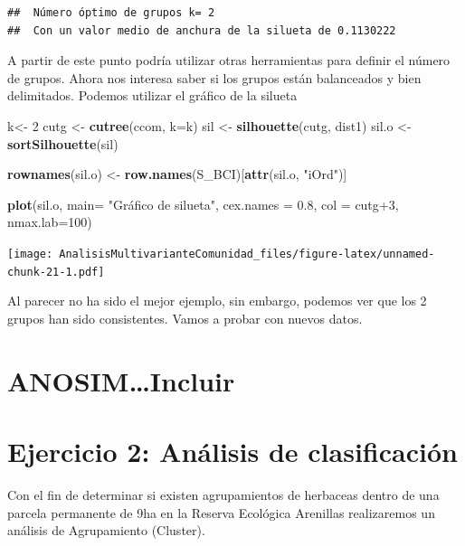 \documentclass[]{book}
\newenvironment{Shaded}{\begin{snugshade}}{\end{snugshade}}
\newcommand{\KeywordTok}[1]{\textcolor[rgb]{0.13,0.29,0.53}{\textbf{{#1}}}}
\newcommand{\DataTypeTok}[1]{\textcolor[rgb]{0.13,0.29,0.53}{{#1}}}
\newcommand{\DecValTok}[1]{\textcolor[rgb]{0.00,0.00,0.81}{{#1}}}
\newcommand{\FloatTok}[1]{\textcolor[rgb]{0.00,0.00,0.81}{{#1}}}
\newcommand{\StringTok}[1]{\textcolor[rgb]{0.31,0.60,0.02}{{#1}}}
\newcommand{\NormalTok}[1]{{#1}}
\begin{document}
\begin{verbatim}
##  Número óptimo de grupos k= 2 
##  Con un valor medio de anchura de la silueta de 0.1130222
\end{verbatim}

A partir de este punto podría utilizar otras herramientas para definir
el número de grupos. Ahora nos interesa saber si los grupos están
balanceados y bien delimitados. Podemos utilizar el gráfico de la
silueta

\begin{Shaded}
\begin{Highlighting}[]
\NormalTok{k<-}\StringTok{ }\DecValTok{2}
\NormalTok{cutg <-}\StringTok{ }\KeywordTok{cutree}\NormalTok{(ccom, }\DataTypeTok{k=}\NormalTok{k)}
\NormalTok{sil <-}\StringTok{ }\KeywordTok{silhouette}\NormalTok{(cutg, dist1)}
\NormalTok{sil.o <-}\StringTok{ }\KeywordTok{sortSilhouette}\NormalTok{(sil)}

\KeywordTok{rownames}\NormalTok{(sil.o) <-}\StringTok{ }\KeywordTok{row.names}\NormalTok{(S_BCI)[}\KeywordTok{attr}\NormalTok{(sil.o, }\StringTok{"iOrd"}\NormalTok{)]}

\KeywordTok{plot}\NormalTok{(sil.o, }\DataTypeTok{main=} \StringTok{"Gráfico de silueta"}\NormalTok{, }\DataTypeTok{cex.names =} \FloatTok{0.8}\NormalTok{, }
     \DataTypeTok{col =} \NormalTok{cutg}\DecValTok{+3}\NormalTok{, }\DataTypeTok{nmax.lab=}\DecValTok{100}\NormalTok{)}
\end{Highlighting}
\end{Shaded}

\texttt{[image: AnalisisMultivarianteComunidad\_files/figure-latex/unnamed-chunk-21-1.pdf]}

Al parecer no ha sido el mejor ejemplo, sin embargo, podemos ver que los
2 grupos han sido consistentes. Vamos a probar con nuevos datos.

\section{ANOSIM\ldots{}Incluir}\label{anosimincluir}

\section{Ejercicio 2: Análisis de
clasificación}\label{ejercicio-2-analisis-de-clasificacion}

Con el fin de determinar si existen agrupamientos de herbaceas dentro de
una parcela permanente de 9ha en la Reserva Ecológica Arenillas
realizaremos un análisis de Agrupamiento (Cluster).
\end{document}
